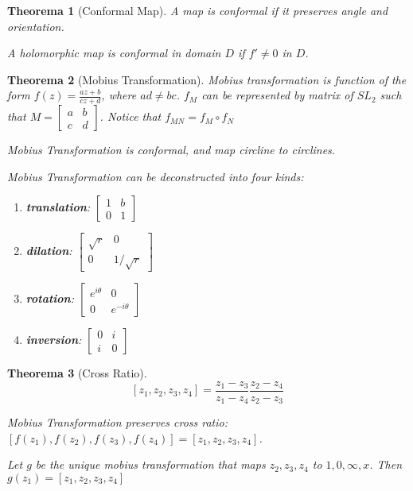 \documentclass[12pt, a4paper]{article}
\newtheorem{theorem}{Theorema}[section]
\theoremstyle{definition}
\theoremstyle{remark}
\renewcommand{\emph}[1]{\textbf{\textit{#1}}}
\begin{document}
\begin{theorem}[Conformal Map]
	A map is conformal if it preserves angle and orientation. 

	A holomorphic map is conformal in domain $D$ if $f' \neq 0$ in  $D$.
\end{theorem}

\begin{theorem}[Mobius Transformation]
	Mobius transformation is function of the form $f(z) = \frac{az + b}{cz + d}$, where $ad \neq bc$. 
	$f_M$ can be represented by matrix of $SL_2$ such that $M = \begin{bmatrix} a & b \\ c & d\end{bmatrix} $. Notice that $f_{MN}= f_M \circ f_N$

	Mobius Transformation is conformal, and map circline to circlines.
	
	Mobius Transformation can be deconstructed into four kinds: 
	\begin{enumerate}
		\item \emph{translation}: $\begin{bmatrix} 1 & b \\ 0 & 1\end{bmatrix}$
		\item \emph{dilation}: $\begin{bmatrix} \sqrt{r} & 0 \\ 0 & 1/\sqrt{r}\end{bmatrix}$
		\item \emph{rotation}: $\begin{bmatrix} e^{i\theta} & 0 \\ 0 & e^{-i\theta}\end{bmatrix}$
		\item \emph{inversion}: $\begin{bmatrix} 0 & i \\ i & 0\end{bmatrix}$
	\end{enumerate}
\end{theorem}

\begin{theorem}[Cross Ratio]
$$
[z_1, z_2, z_3, z_4] = \frac{z_1 - z_3}{z_1 - z_4} \frac{z_2 - z_4}{z_2 - z_3}
$$

Mobius Transformation preserves cross ratio: $[f(z_1), f(z_2), f(z_3), f(z_4)] = [z_1, z_2, z_3, z_4]$. 

Let $g$ be the unique mobius transformation that maps $z_2, z_3, z_4$ to $1, 0, \infty, x$. Then $g(z_1) = [z_1, z_2, z_3, z_4]$
\end{theorem}
\end{document}
